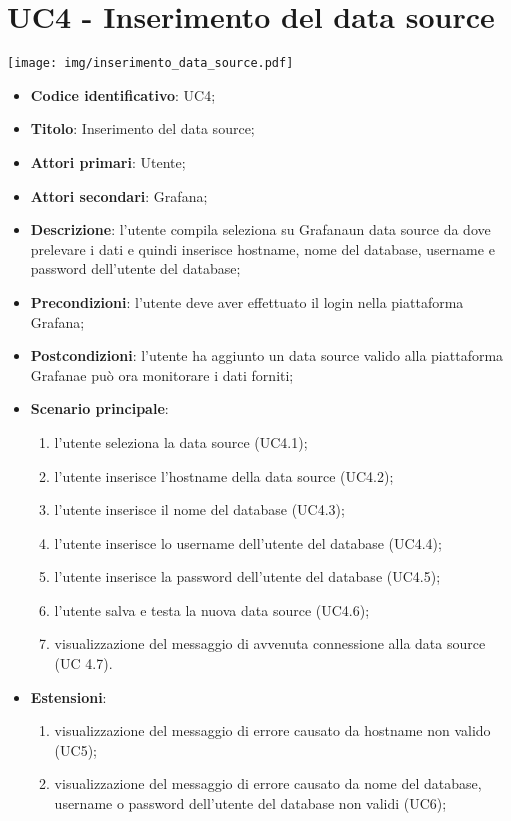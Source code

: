 \section{UC4 - Inserimento del data source}
\hspace*{-1.5cm}\texttt{[image: img/inserimento\_data\_source.pdf]}
\mbox{} \mbox{} \\
\begin{itemize}
    \item \textbf{Codice identificativo}: UC4;
    \item \textbf{Titolo}: Inserimento del data source;
    \item \textbf{Attori primari}: Utente;
    \item \textbf{Attori secondari}: Grafana\glo;
    \item \textbf{Descrizione}: l'utente compila seleziona su Grafana\glosp un data source da dove prelevare i dati e quindi inserisce                               hostname, nome del database, username e password dell'utente del database;
    \item \textbf{Precondizioni}: l'utente deve aver effettuato il login nella piattaforma Grafana\glo;
    \item \textbf{Postcondizioni}: l'utente ha aggiunto un data source valido alla piattaforma Grafana\glosp e può ora monitorare i dati                                forniti;
    \item \textbf{Scenario principale}:
    \begin{enumerate}
        \item l'utente seleziona la data source (UC4.1);
        \item l'utente inserisce l'hostname della data source (UC4.2);
        \item l'utente inserisce il nome del database (UC4.3);
        \item l'utente inserisce lo username dell'utente del database (UC4.4);
        \item l'utente inserisce la password dell'utente del database (UC4.5);
        \item l'utente salva e testa la nuova data source (UC4.6);
        \item visualizzazione del messaggio di avvenuta connessione alla data source (UC 4.7).
    \end{enumerate}
    \item \textbf{Estensioni}:
    \begin{enumerate}
        \item visualizzazione del messaggio di errore causato da hostname non valido (UC5);
        \item visualizzazione del messaggio di errore causato da nome del database, username o password dell'utente del database non           validi (UC6);
    \end{enumerate}
\end{itemize}

